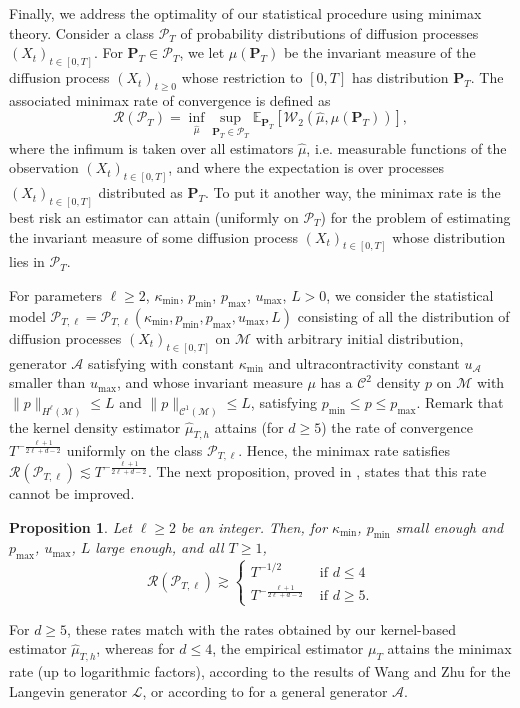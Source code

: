 \documentclass[10pt,a4paper]{article}
\newcommand{\E}{{\mathbb E}}
\renewcommand{\P}{{\mathbf P}}
\newcommand{\cR}{{\mathcal R}}
\newcommand{\cL}{\mathcal{L}}
\newcommand\cA{\mathcal{A}}
\newcommand\cC{\mathcal{C}}
\newcommand\cM{\mathcal{M}}
\newcommand\W{\mathcal{W}}
\newcommand\cP{\mathcal{P}}
\newtheorem{proposition}[theorem]{Proposition}
\begin{document}
Finally, we address the optimality of our statistical procedure using  minimax theory. Consider a class $\cP_T$ of probability distributions of diffusion processes $(X_t)_{t\in [0,T]}$. For $\P_T\in \cP_T$, we let $\mu(\P_T)$ be the invariant measure of the diffusion process $(X_t)_{t\ge 0}$ whose restriction to $[0,T]$ has distribution $\P_T$. The associated minimax rate of convergence is defined as 
\begin{equation}\label{eq:minimax}
  \cR(\cP_T)=  \inf_{\hat \mu}\sup_{\P_T\in \cP_T} \E_{\P_{T}}[\W_2(\hat\mu, \mu(\P_T))],
\end{equation}
where the infimum is taken over all estimators $\hat \mu$, i.e. measurable functions of the observation $(X_t)_{t\in [0,T]}$, and where the expectation is over processes $(X_t)_{t\in [0,T]}$ distributed as $\P_T$. 
To put it another way, the minimax rate is the best risk an estimator can attain (uniformly on $\mathcal{P}_T$) for the problem of estimating the invariant measure of some diffusion process $(X_t)_{t\in [0,T]}$ whose distribution lies in $\cP_T$.


For parameters $\ell\ge 2$, $\kappa_{\min}$, $p_{\min}$, $p_{\max}$, $u_{\max}$, $L>0$, 
we consider the statistical model $\cP_{T,\ell}=\cP_{T,\ell}(\kappa_{\min},p_{\min},p_{\max},u_{\max}, L)$ consisting of all the distribution of diffusion processes $(X_t)_{t\in [0,T]}$ on $\cM$ with arbitrary initial distribution, generator $\cA$ satisfying  with constant $\kappa_{\min}$ and ultracontractivity constant $u_\cA$ smaller than $u_{\max}$, and whose invariant measure $\mu$  has a $\cC^2$ density $p$ on $\cM$ with $\|p\|_{H^\ell(\cM)}\le L$ and $\|p\|_{\cC^1(\cM)}\le L$,  satisfying $p_{\min}\le p\le p_{\max}$. 
Remark that the kernel density estimator $\widehat{\mu}_{T,h}$ attains (for $d\ge 5$) the rate of convergence $T^{-\frac{\ell+1}{2\ell+d-2}}$ uniformly on the class $\cP_{T,\ell}$. Hence, the minimax rate satisfies $\cR(\cP_{T,\ell})\lesssim T^{-\frac{\ell+1}{2\ell+d-2}}$. The next proposition, proved in , states that this rate cannot be improved.


\begin{proposition}\label{prop:minimax}
    Let $\ell \ge 2$ be an integer. Then, for $\kappa_{\min}$, $p_{\min}$ small enough and $p_{\max}$, $u_{\max}$, $L$ large enough, {and all $T\ge 1$,}
    \begin{equation}
        \cR(\cP_{T,\ell}) \gtrsim \begin{cases}
                     T^{-1/2}& \text{ if }d\le 4\\
             T^{-\frac{\ell +1}{2\ell+d-2}}& \text{ if }d\ge 5.
        \end{cases}
    \end{equation}
\end{proposition}
For $d\ge 5$, these rates match with the rates obtained by our kernel-based estimator $\widehat{\mu}_{T,h}$, whereas for $d\le 4$, the empirical estimator $\mu_T$ attains the minimax rate (up to logarithmic factors), according to the results of Wang and Zhu \cite{Wang2023} for the Langevin generator $\cL$, or according to   for a general generator $\cA$.
\end{document}
